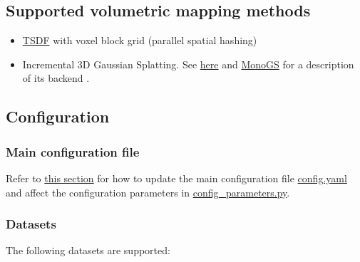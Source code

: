 \documentclass{article}
\providecommand{\tightlist}{%
  \setlength{\itemsep}{0pt}\setlength{\parskip}{0pt}}
\begin{document}
\hypertarget{supported-volumetric-mapping-methods}{%
\subsection{Supported volumetric mapping
methods}\label{supported-volumetric-mapping-methods}}

\begin{itemize}
\tightlist
\item
  \href{https://arxiv.org/pdf/2110.00511}{TSDF} with voxel block grid
  (parallel spatial hashing)~\cite{dong2022ash}
\item
  Incremental 3D Gaussian Splatting. See
  \href{https://repo-sam.inria.fr/fungraph/3d-gaussian-splatting/}{here}
  and \href{https://arxiv.org/abs/2312.06741}{MonoGS} for a description
  of its backend \cite{matsuki2023gaussian, kerbl20233d}.
\end{itemize}



\hypertarget{configuration}{%
\subsection{Configuration}\label{configuration}}

\hypertarget{main-configuration-file}{%
\subsubsection{Main configuration file}\label{main-configuration-file}}

Refer to
\protect\hyperlink{selecting-a-dataset-and-different-configuration-parameters}{this
section} for how to update the main configuration file
\href{./config.yaml}{config.yaml} and affect the configuration
parameters in \href{./config_parameters.py}{config\_parameters.py}.

\hypertarget{datasets}{%
\subsubsection{Datasets}\label{datasets}}

The following datasets are supported:
\end{document}

